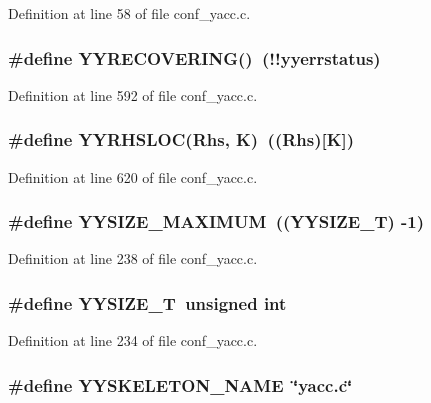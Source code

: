 Definition at line 58 of file conf\_\-yacc.c.
\subsubsection[{YYRECOVERING}]{\setlength{\rightskip}{0pt plus 5cm}\#define YYRECOVERING()~(!!yyerrstatus)}\label{conf__yacc_8c_ad860e18ca4b79fc589895b531bdb7948}


Definition at line 592 of file conf\_\-yacc.c.
\subsubsection[{YYRHSLOC}]{\setlength{\rightskip}{0pt plus 5cm}\#define YYRHSLOC(Rhs, \/  K)~((Rhs)[K])}\label{conf__yacc_8c_ab2b4f027a2b092ac14ca4464e7b3db60}


Definition at line 620 of file conf\_\-yacc.c.
\subsubsection[{YYSIZE\_\-MAXIMUM}]{\setlength{\rightskip}{0pt plus 5cm}\#define YYSIZE\_\-MAXIMUM~((YYSIZE\_\-T) -\/1)}\label{conf__yacc_8c_ab4bb7ad82d4a7e2df49ff6a8fb484109}


Definition at line 238 of file conf\_\-yacc.c.
\subsubsection[{YYSIZE\_\-T}]{\setlength{\rightskip}{0pt plus 5cm}\#define YYSIZE\_\-T~unsigned int}\label{conf__yacc_8c_a7d535939e93253736c6eeda569d24de5}


Definition at line 234 of file conf\_\-yacc.c.
\subsubsection[{YYSKELETON\_\-NAME}]{\setlength{\rightskip}{0pt plus 5cm}\#define YYSKELETON\_\-NAME~\char`\"{}yacc.c\char`\"{}}\label{conf__yacc_8c_a50db5aef8c2b6f13961b2480b37f84c0}


